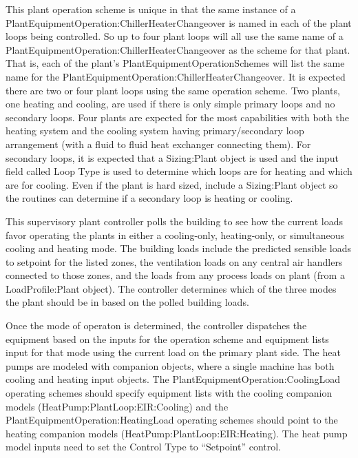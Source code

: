 This plant operation scheme is unique in that the same instance of a PlantEquipmentOperation:ChillerHeaterChangeover is named in each of the plant loops being controlled.  So up to four plant loops will all use the same name of a PlantEquipmentOperation:ChillerHeaterChangeover as the scheme for that plant.  That is, each of the plant's PlantEquipmentOperationSchemes will list the same name for the PlantEquipmentOperation:ChillerHeaterChangeover.  It is expected there are two or four plant loops using the same operation scheme.  Two plants, one heating and cooling, are used if there is only simple primary loops and no secondary loops.  Four plants are expected for the most capabilities with both the heating system and the cooling system having primary/secondary loop arrangement (with a fluid to fluid heat exchanger connecting them).  For secondary loops, it is expected that a Sizing:Plant object is used and the input field called Loop Type is used to determine which loops are for heating and which are for cooling.  Even if the plant is hard sized, include a Sizing:Plant object so the routines can determine if a secondary loop is heating or cooling.  

This supervisory plant controller polls the building to see how the current loads favor operating the plants in either a cooling-only, heating-only, or simultaneous cooling and heating mode.  The building loads include the predicted sensible loads to setpoint for the listed zones, the ventilation loads on any central air handlers connected to those zones, and the loads from any process loads on plant (from a LoadProfile:Plant object).  The controller determines which of the three modes the plant should be in based on the polled building loads. 

Once the mode of operaton is determined, the controller dispatches the equipment based on the inputs for the operation scheme and equipment lists input for that mode using the current load on the primary plant side.  The heat pumps are modeled with companion objects, where a single machine has both cooling and heating input objects.  The PlantEquipmentOperation:CoolingLoad operating schemes should specify equipment lists with the cooling companion models (HeatPump:PlantLoop:EIR:Cooling) and the PlantEquipmentOperation:HeatingLoad operating schemes should point to the heating companion models (HeatPump:PlantLoop:EIR:Heating).  The heat pump model inputs need to set the Control Type to ``Setpoint'' control. 

